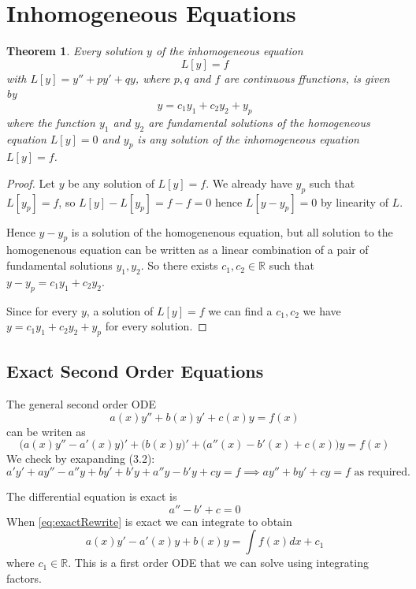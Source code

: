 \documentclass{article}
\theoremstyle{plain}
\newtheorem{thm}{Theorem}[section]
\theoremstyle{definition}
\numberwithin{equation}{section}
\begin{document}
\section{Inhomogeneous Equations}

\begin{thm}
Every solution $y$ of the inhomogeneous equation
\[ L[y] = f \]
with $L[y] = y'' + py' + qy$, where $p,q$ and $f$ are continuous ffunctions, is given by
\[ y = c_1y_1 + c_2y_2 + y_p \]
where the function $y_1$ and $y_2$ are fundamental solutions of the homogeneous equation $L[y]=0$ and $y_p$ is any solution of the inhomogeneous equation $L[y] = f$. 
\end{thm}

\begin{proof}
    Let $y$ be any solution of $L[y]=f$. We already have $y_p$ such that $L[y_p] = f$, so $L[y]-L[y_p] = f-f = 0$ hence $L[y-y_p] = 0$ by linearity of $L$.

    Hence $y-y_p$ is a solution of the homogenenous equation, but all solution to the homogenenous equation can be written as a linear combination of a pair of fundamental solutions $y_1,y_2$. So there exists $c_1,c_2 \in \mathbb{R}$ such that $y-y_p=c_1y_1 + c_2y_2$.

    Since for every $y$, a solution of $L[y]=f$ we can find a $c_1,c_2$ we have $y=c_1y_1 + c_2y_2 + y_p$ for every solution.
\end{proof}

\subsection{Exact Second Order Equations}

The general second order ODE
\begin{equation}\label{eq:generalLinear}
    a(x)y'' + b(x)y' + c(x)y = f(x)
\end{equation}
can be writen as
\begin{equation}\label{eq:exactRewrite}
    \big( a(x)y'' - a'(x)y\big)' + \big(b(x)y\big)' + \big(a''(x) - b'(x) + c(x)\big)y = f(x)
\end{equation}
We check by exapanding (3.2):
\[ a'y'+ay'' - a''y + by' + b'y + a''y - b'y + cy = f  \implies ay'' + by' + cy = f \text{ as required.}\]

The differential equation is exact is
\begin{equation}\label{eq:exactSuffCrit}
    a''-b'+c = 0
\end{equation}
When \eqref{eq:exactRewrite} is exact we can integrate to obtain
\[ a(x)y' - a'(x)y + b(x) y = \int f(x) dx + c_1 \]
where $c_1 \in \mathbb{R}$. This is a first order ODE that we can solve using integrating factors.
\end{document}
